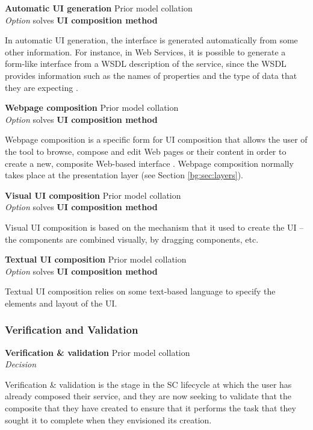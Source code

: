 \textbf{Automatic UI generation} \hfill Prior model collation \cite{Grammel2010} \\ \emph{Option} \hfill solves \textbf{UI composition method}

In automatic UI generation, the interface is generated automatically from some other information. For instance, in Web Services, it is possible to generate a form-like interface from a WSDL description of the service, since the WSDL provides information such as the names of properties and the type of data that they are expecting \cite{Grammel2010}.

\textbf{Webpage composition} \hfill Prior model collation \cite{Minhas2012} \\ \emph{Option} \hfill solves \textbf{UI composition method}

Webpage composition is a specific form for UI composition that allows the user of the tool to browse, compose and edit Web pages or their content in order to create a new, composite Web-based interface \cite{Grammel2010}. Webpage composition normally takes place at the presentation layer (see Section \ref{bg:sec:layers}).

\textbf{Visual UI composition} \hfill Prior model collation \cite{Grammel2010} \\ \emph{Option} \hfill solves \textbf{UI composition method}

Visual UI composition is based on the mechanism that it used to create the UI -- the components are combined visually, by dragging components, etc.

\textbf{Textual UI composition} \hfill Prior model collation \cite{Grammel2010} \\ \emph{Option} \hfill solves \textbf{UI composition method}

Textual UI composition relies on some text-based language to specify the elements and layout of the UI.

\subsubsection{Verification and Validation}

\textbf{Verification \& validation} \hfill Prior model collation \cite{Mehandjiev2012} \\ \emph{Decision} \hfill 

Verification \& validation is the stage in the SC lifecycle at which the user has already composed their service, and they are now seeking to validate that the composite that they have created to ensure that it performs the task that they sought it to complete when they envisioned its creation.

